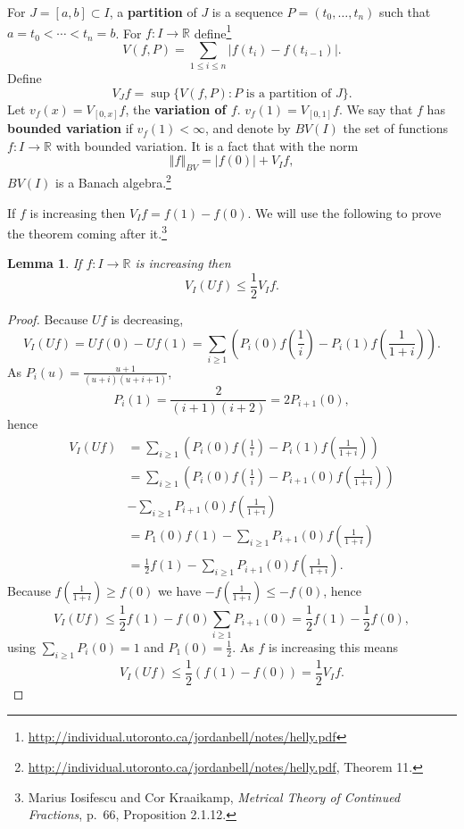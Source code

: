 \documentclass{article}
\newcommand{\norm}[1]{\left\Vert #1 \right\Vert}
\newtheorem{lemma}[theorem]{Lemma}
\theoremstyle{definition}
\begin{document}
For $J=[a,b] \subset I$, 
a \textbf{partition} of $J$ is a sequence $P=(t_0,\ldots,t_n)$ such that $a=t_0<\cdots<t_n=b$. 
For $f:I \to \mathbb{R}$ define\footnote{\url{http://individual.utoronto.ca/jordanbell/notes/helly.pdf}}
\[
V(f,P) = \sum_{1 \leq i \leq n} |f(t_i)-f(t_{i-1})|.
\]
Define
\[
V_J f = \sup\{V(f,P): \textrm{$P$ is a partition of $J$}\}.
\]
Let $v_f(x) = V_{[0,x]} f$, the \textbf{variation of $f$}. $v_f(1)=V_{[0,1]} f$. 
We say that $f$ has \textbf{bounded variation} if $v_f(1)< \infty$, and denote by $BV(I)$ the set of
functions $f:I \to \mathbb{R}$ with bounded variation. It is a fact that
with the norm
\[
\norm{f}_{BV} = |f(0)| + V_I f,
\]
$BV(I)$ is a Banach algebra.\footnote{\url{http://individual.utoronto.ca/jordanbell/notes/helly.pdf},
Theorem 11.}

If $f$ is increasing then $V_I f = f(1)-f(0)$. We will use the following to prove the theorem coming after it.\footnote{Marius Iosifescu and Cor Kraaikamp,
{\em Metrical Theory of Continued Fractions}, p.~66, Proposition 2.1.12.}

\begin{lemma}
If $f:I \to \mathbb{R}$ is increasing then 
\[
V_I (Uf) \leq \frac{1}{2} V_I f.
\]
\end{lemma}
\begin{proof}
Because $Uf$ is decreasing, 
\[
V_I(Uf) = Uf(0)-Uf(1) = \sum_{i \geq 1} \left( P_i(0)f\left(\frac{1}{i}\right) - P_i(1) f\left(\frac{1}{1+i}\right)\right).
\]
As $P_i(u)=\frac{u+1}{(u+i)(u+i+1)}$,
\[
P_i(1) = \frac{2}{(i+1)(i+2)} = 2P_{i+1}(0),
\]
hence 
\begin{align*}
V_I(Uf)&=\sum_{i \geq 1} \left( P_i(0)f\left(\frac{1}{i}\right) - P_i(1) f\left(\frac{1}{1+i}\right)\right)\\
&=\sum_{i \geq 1}  \left( P_i(0)f\left(\frac{1}{i}\right) - P_{i+1}(0) f\left(\frac{1}{1+i}\right)\right)\\
&-\sum_{i \geq 1} P_{i+1}(0) f\left(\frac{1}{1+i}\right)\\
&=P_1(0)f(1) -\sum_{i \geq 1} P_{i+1}(0) f\left(\frac{1}{1+i}\right)\\
&=\frac{1}{2}f(1) - \sum_{i \geq 1} P_{i+1}(0) f\left(\frac{1}{1+i}\right).
\end{align*}
Because $ f\left(\frac{1}{1+i}\right) \geq f(0)$ we have  $- f\left(\frac{1}{1+i}\right) \leq - f(0)$, hence 
\[
V_I(Uf) \leq \frac{1}{2}f(1) -f(0) \sum_{i \geq 1} P_{i+1}(0) = \frac{1}{2}f(1)  - \frac{1}{2}f(0),
\]
using $\sum_{i \geq 1} P_i(0) = 1$ and $P_1(0)=\frac{1}{2}$. 
As $f$ is increasing this means
\[
V_I(Uf) \leq \frac{1}{2}(f(1)-f(0)) = \frac{1}{2} V_I f.
\]
\end{proof}
\end{document}
